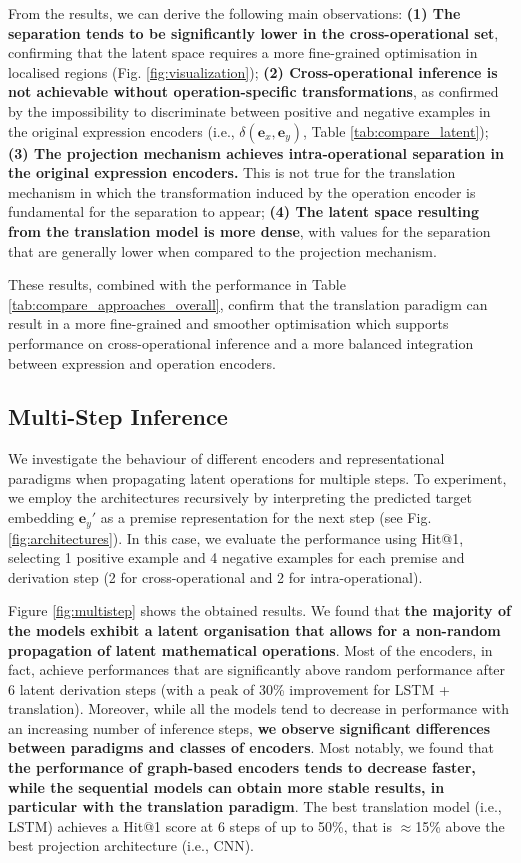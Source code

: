 \documentclass[11pt]{article}
\begin{document}
From the results, we can derive the following main observations: 
\textbf{(1) The separation tends to be significantly lower in the cross-operational set}, confirming that the latent space requires a more fine-grained optimisation in localised regions (Fig. \ref{fig:visualization}); \textbf{(2) Cross-operational inference is not achievable without operation-specific transformations}, as confirmed by the impossibility to discriminate between positive and negative examples in the original expression encoders (i.e., $\delta(\textbf{e}_x, \textbf{e}_y)$, Table \ref{tab:compare_latent}); \textbf{(3) The projection mechanism achieves intra-operational separation in the original expression encoders.} This is not true for the translation mechanism in which the transformation induced by the operation encoder is fundamental for the separation to appear; \textbf{(4) The latent space resulting from the translation model is more dense}, with values for the separation that are generally lower when compared to the projection mechanism.

These results, combined with the performance in Table \ref{tab:compare_approaches_overall}, confirm that the translation paradigm can result in a more fine-grained and smoother optimisation which supports performance on cross-operational inference and a more balanced integration between expression and operation encoders. 

\subsection{Multi-Step Inference}
\label{sec:multi_step_derivations}

We investigate the behaviour of different encoders and representational paradigms when propagating latent operations for multiple steps. 
To experiment, we employ the architectures recursively by interpreting the predicted target embedding $\textbf{e}_y'$ as a premise representation for the next step (see Fig. \ref{fig:architectures}). In this case, we evaluate the performance using Hit@1, selecting 1 positive example and 4 negative examples for each premise and derivation step (2 for cross-operational and 2 for intra-operational). 

Figure \ref{fig:multistep} shows the obtained results. We found that \textbf{the majority of the models exhibit a latent organisation that allows for a non-random propagation of latent mathematical operations}. Most of the encoders, in fact, achieve performances that are significantly above random performance after 6 latent derivation steps (with a peak of 30\% improvement for LSTM + translation). Moreover, while all the models tend to decrease in performance with an increasing number of inference steps, \textbf{we observe significant differences between paradigms and classes of encoders}. Most notably, we found that \textbf{the performance of graph-based encoders tends to decrease faster, while the sequential models can obtain more stable results, in particular with the translation paradigm}. The best translation model (i.e., LSTM) achieves a Hit@1 score at 6 steps of up to 50\%, that is $\approx$15\% above the best projection architecture (i.e., CNN). 
\end{document}
